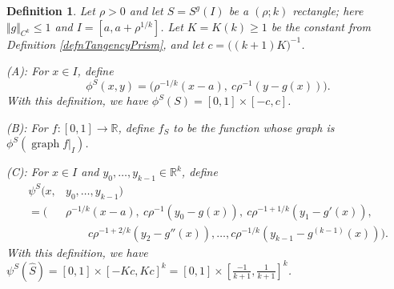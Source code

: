 \documentclass[letterpaper, reqno,11pt]{article}
\numberwithin{equation}{section}
\newcommand{\RR}{\mathbb{R}}
\numberwithin{thm}{section}
\newtheorem{defn}[thm]{Definition}
\theoremstyle{remark}
\begin{document}
\begin{defn}\label{pullbackRect}
Let $\rho>0$ and let $S=S^g(I)$ be a $(\rho;k)$ rectangle; here $\Vert g \Vert_{C^k}\leq 1$ and $I=[a, a+\rho^{1/k}]$. Let $K=K(k)\geq 1$ be the constant from Definition \ref{defnTangencyPrism}, and let $c=\big((k+1)K\big)^{-1}$. 

\smallskip

\noindent (A): For $x\in I$, define
\[
\phi^S(x,y) = \big( \rho^{-1/k}(x-a),\ c\rho^{-1}(y-g(x))\big).
\]
With this definition, we have $\phi^S(S)=[0,1]\times [-c,c]$.

\smallskip

\noindent (B): For $f\colon [0,1]\to\RR$, define $f_S$ to be the function whose graph is $\phi^S(\operatorname{graph}f|_I)$. 

\smallskip

\noindent (C): For $x\in I$ and $y_0,\ldots,y_{k-1}\in\RR^k$, define 
\begin{equation*}
\begin{split}
\psi^S(x,&y_0,\ldots,y_{k-1}) \\
= \Big(&\rho^{-1/k}(x-a),\ c\rho^{-1}(y_0-g(x)),\ c\rho^{-1+1/k}(y_1-g'(x)),\\
& \qquad c\rho^{-1+2/k}(y_2-g''(x)),\ldots, c\rho^{-1/k}(y_{k-1}-g^{(k-1)}(x))\Big).
\end{split}
\end{equation*}
With this definition, we have $\psi^S(\hat S)=[0,1]\times [-Kc,Kc]^k = [0,1]\times [\frac{-1}{k+1},\frac{1}{k+1}]^k$.
\end{defn}
\end{document}
